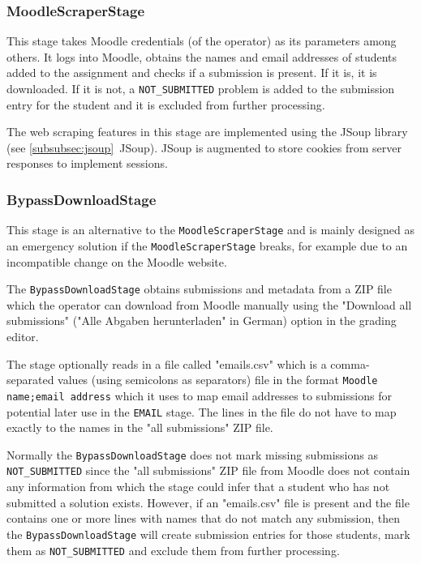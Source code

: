 \documentclass[12pt,a4paper,oneside]{report}
\begin{document}
	\subsubsection{MoodleScraperStage}
	This stage takes Moodle credentials (of the operator) as its parameters among others. It logs into Moodle, obtains the names and email addresses of students added to the assignment and checks if a submission is present. If it is, it is downloaded. If it is not, a \lstinline|NOT_SUBMITTED| problem is added to the submission entry for the student and it is excluded from further processing.

	The web scraping features in this stage are implemented using the JSoup library (see \ref{subsubsec:jsoup}~JSoup). JSoup is augmented to store cookies from server responses to implement sessions.

	\subsubsection{BypassDownloadStage}
	This stage is an alternative to the \lstinline|MoodleScraperStage| and is mainly designed as an emergency solution if the \lstinline|MoodleScraperStage| breaks, for example due to an incompatible change on the Moodle website.

	The \lstinline|BypassDownloadStage| obtains submissions and metadata from a ZIP file which the operator can download from Moodle manually using the "Download all submissions" ("Alle Abgaben herunterladen" in German) option in the grading editor.

	The stage optionally reads in a file called "emails.csv" which is a comma-separated values (using semicolons as separators) file in the format \lstinline|Moodle name;email address| which it uses to map email addresses to submissions for potential later use in the \lstinline|EMAIL| stage. The lines in the file do not have to map exactly to the names in the "all submissions" ZIP file.

	Normally the \lstinline|BypassDownloadStage| does not mark missing submissions as \linebreak\lstinline|NOT_SUBMITTED| since the "all submissions" ZIP file from Moodle does not contain any information from which the stage could infer that a student who has not submitted a solution exists. However, if an "emails.csv" file is present and the file contains one or more lines with names that do not match any submission, then the \lstinline|BypassDownloadStage| will create submission entries for those students, mark them as \lstinline|NOT_SUBMITTED| and exclude them from further processing.
\end{document}
